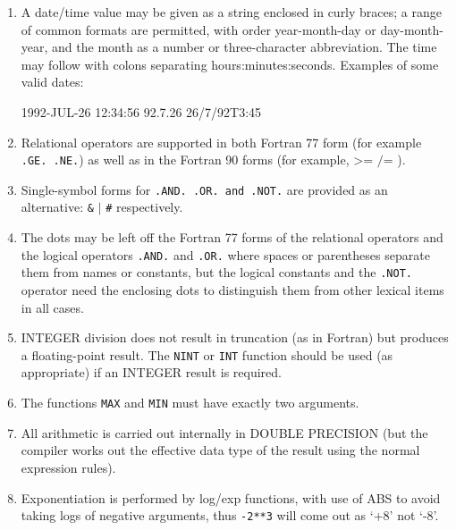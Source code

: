 \documentclass[twoside,11pt]{starlink}
\begin{document}
\begin{enumerate}
  \item A date/time value may be given as a string enclosed in curly
   braces; a range of common formats are permitted, with order
   year-month-day or day-month-year, and the month as a number or
   three-character abbreviation.  The time may follow with colons separating
   hours:minutes:seconds.  Examples of some valid dates:
  \begin{terminalv}
1992-JUL-26 12:34:56
92.7.26
26/7/92T3:45
  \end{terminalv}

  \item Relational operators are supported in both Fortran 77 form
   (for example \texttt{.GE. .NE.}) as well as in the Fortran 90 forms (for
   example, $\texttt{>=}$ $\texttt{/=}$ ).

  \item Single-symbol forms for \texttt{.AND. .OR. and .NOT.} are provided as
   an alternative: \texttt{\&} $\texttt{|}$ \texttt{\#} respectively.

  \item The dots may be left off the Fortran 77 forms of the relational
   operators and the logical operators \texttt{.AND.} and \texttt{.OR.} where
   spaces or parentheses separate them from names or constants, but the
   logical constants and the \texttt{.NOT.} operator need the enclosing dots
   to distinguish them from other lexical items in all cases.

  \item INTEGER division does not result in truncation (as in Fortran)
   but produces a floating-point result.  The \texttt{NINT} or \texttt{INT}
   function should be used (as appropriate) if an INTEGER result is
   required.

  \item The functions \texttt{MAX} and \texttt{MIN} must have exactly two
   arguments.

  \item All arithmetic is carried out internally in DOUBLE PRECISION
   (but the compiler works out the effective data type of the result using
   the normal expression rules).

  \item Exponentiation is performed by log/exp functions, with use of
   ABS to avoid taking logs of negative arguments, thus \texttt{-2**3} will
   come out as `+8' not `-8'.

\end{enumerate}
\end{document}
